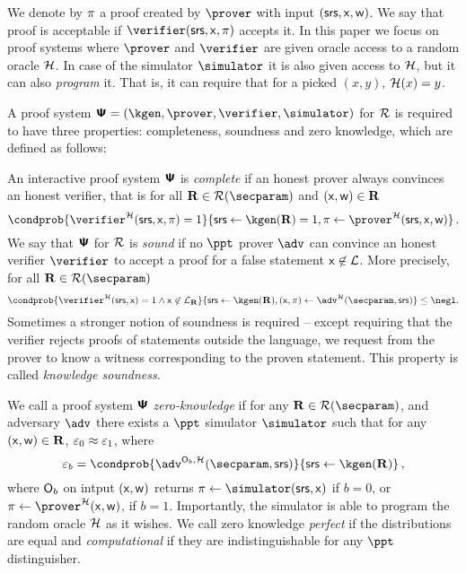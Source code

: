We denote by $\pi$ a proof created by $\prover$ with input
$(\mathsf{srs}, \mathsf{x}, \mathsf{w})$. We say that proof is acceptable if $\verifier (\srs, \inp, \zkproof)$ accepts it. In this paper we focus on proof systems where $\prover$ and $\verifier$ are given oracle access to a random oracle $\mathcal{H}$. In case of the simulator $\simulator$ it is also given access to $\mathcal{H}$, but it can also \emph{program} it. That is, it can require that for a picked $(x, y)$, $\mathcal{H} (x) = y$.

A proof system $\proofsystem = (\kgen, \prover, \verifier, \simulator)$ for $\mathcal{R}$ is
required to have three properties: completeness, soundness and zero knowledge, which are
defined as follows:

  An interactive proof system $\bm{\mathsf{\Psi}}$ is
  \emph{complete} if an honest prover always convinces an honest verifier, that
  is for all $\REL \in \RELGEN(\secparam)$ and $(\mathsf{x}, \mathsf{w}) \in \mathbf{R}$
	\[
		\condprob{\verifier^\ro (\srs, \inp, \zkproof) = 1} {\srs \gets \kgen(\REL) = 1, \zkproof \gets \prover^\ro (\srs, \inp, \wit)}\,.
	\]
    We say that $\bm{\mathsf{\Psi}}$ for $\mathcal{R}$ is \emph{sound} if no
  $\ppt$ prover $\adv$ can convince an honest verifier $\verifier$ to accept a
  proof for a false statement $\mathsf{x} \not\in\mathcal{L}$. More precisely, for
  all $\REL \in \RELGEN(\secparam)$
	\[
    \condprob{ \verifier^\ro (\srs, \inp) = 1 \land \inp \not\in \LANG_\REL}{\srs \gets \kgen(\REL), (\inp, \zkproof) \gets \adv^\ro(\secparam, \srs)} \leq
    \negl.
	\]
Sometimes a stronger notion of soundness is required -- except requiring that the
verifier rejects proofs of statements outside the language, we request from the
prover to know a witness corresponding to the proven statement. This property is
called \emph{knowledge soundness}.%
 
  We call a proof system $\bm{\mathsf{\Psi}}$
\emph{zero-knowledge} if for any $\REL \in \RELGEN(\secparam)$, and adversary
$\adv$ there exists a $\ppt$ simulator $\simulator$ such that for any
$(\mathsf{x}, \mathsf{w}) \in \mathbf{R}$, $\varepsilon_0 \approx \varepsilon_1$, where
\[
  \eps_b = \condprob{\adv^{\oracleo_b, \ro} (\secparam, \srs)}{\srs \gets \kgen (\REL)}\,,
\]
where $\mathsf{O}_b$ on intput $(\mathsf{x}, \mathsf{w})$ returns $\zkproof \gets \simulator (\srs, \inp)$ if $b = 0$, or $\zkproof \gets \prover^\ro (\inp, \wit)$, if $b = 1$. Importantly, the simulator is able to program the random oracle $\mathcal{H}$ as it wishes.
We call zero knowledge \emph{perfect} if the distributions are equal and
\emph{computational} if they are indistinguishable for any $\ppt$ distinguisher.

